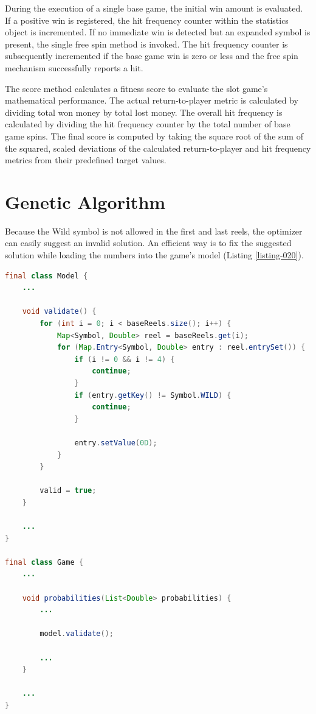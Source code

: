 \documentclass[12pt,twoside,openany]{book}
\begin{document}
During the execution of a single base game, the initial win amount is evaluated. If a positive win is registered, the hit frequency counter within the statistics object is incremented. If no immediate win is detected but an expanded symbol is present, the single free spin method is invoked. The hit frequency counter is subsequently incremented if the base game win is zero or less and the free spin mechanism successfully reports a hit.

The score method calculates a fitness score to evaluate the slot game's mathematical performance. The actual return-to-player metric is calculated by dividing total won money by total lost money. The overall hit frequency is calculated by dividing the hit frequency counter by the total number of base game spins. The final score is computed by taking the square root of the sum of the squared, scaled deviations of the calculated return-to-player and hit frequency metrics from their predefined target values.

\section{Genetic Algorithm}

Because the Wild symbol is not allowed in the first and last reels, the optimizer can easily suggest an invalid solution. An efficient way is to fix the suggested solution while loading the numbers into the game's model (Listing \ref{listing-020}).

\begin{lstlisting}[language=Java, caption={Fix internal game model}, label=listing-020]
final class Model {
	...

	void validate() {
		for (int i = 0; i < baseReels.size(); i++) {
			Map<Symbol, Double> reel = baseReels.get(i);
			for (Map.Entry<Symbol, Double> entry : reel.entrySet()) {
				if (i != 0 && i != 4) {
					continue;
				}
				if (entry.getKey() != Symbol.WILD) {
					continue;
				}

				entry.setValue(0D);
			}
		}

		valid = true;
	}

	...
}

final class Game {
	...

	void probabilities(List<Double> probabilities) {
		...

		model.validate();

		...
	}

	...
}
\end{lstlisting}
\end{document}
